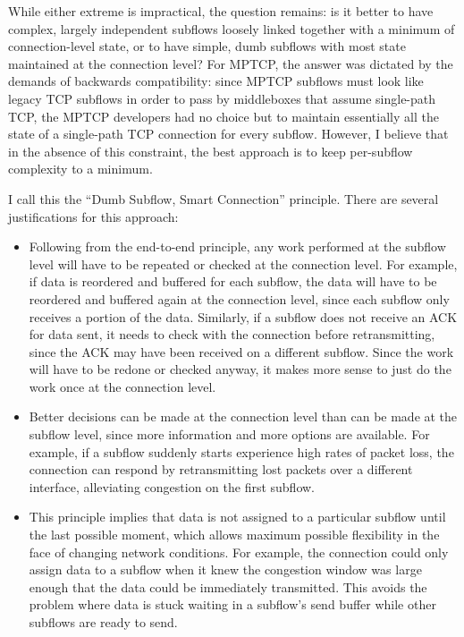 While either extreme is impractical, the question remains: is it better to have complex, largely independent subflows loosely linked together with a minimum of connection-level state, or to have simple, dumb subflows with most state maintained at the connection level? For MPTCP, the answer was dictated by the demands of backwards compatibility: since MPTCP subflows must look like legacy TCP subflows in order to pass by middleboxes that assume single-path TCP, the MPTCP developers had no choice but to maintain essentially all the state of a single-path TCP connection for every subflow. However, I believe that in the absence of this constraint, the best approach is to keep per-subflow complexity to a minimum.

I call this the ``Dumb Subflow, Smart Connection'' principle. There are several justifications for this approach:

\begin{itemize}
  \item Following from the end-to-end principle, any work performed at the subflow level will have to be repeated or checked at the connection level. For example, if data is reordered and buffered for each subflow, the data will have to be reordered and buffered again at the connection level, since each subflow only receives a portion of the data. Similarly, if a subflow does not receive an ACK for data sent, it needs to check with the connection before retransmitting, since the ACK may have been received on a different subflow. Since the work will have to be redone or checked anyway, it makes more sense to just do the work once at the connection level.
  \item Better decisions can be made at the connection level than can be made at the subflow level, since more information and more options are available. For example, if a subflow suddenly starts experience high rates of packet loss, the connection can respond by retransmitting lost packets over a different interface, alleviating congestion on the first subflow. 
  \item This principle implies that data is not assigned to a particular subflow until the last possible moment, which allows maximum possible flexibility in the face of changing network conditions. For example, the connection could only assign data to a subflow when it knew the congestion window was large enough that the data could be immediately transmitted. This avoids the problem where data is stuck waiting in a subflow's send buffer while other subflows are ready to send.
\end{itemize}

